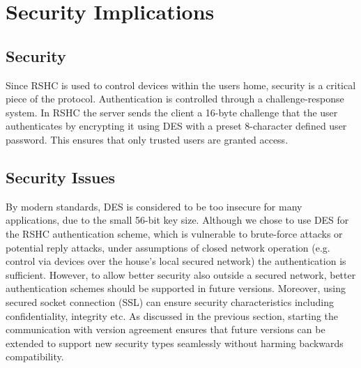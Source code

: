 \section{Security Implications}
\label{sec:security}

\subsection{Security}
\label{sec:security:sec}

Since RSHC is used to control devices within the users home, security is a critical piece of the protocol.  Authentication is controlled through a challenge-response system.  In RSHC the server sends the client a 16-byte challenge that the user authenticates by encrypting it using DES with a preset 8-character defined user password.  This ensures that only trusted users are granted access.

\subsection{Security Issues}
\label{sec:security:issues}

By modern standards, DES is considered to be too insecure for many applications, due to the small 56-bit key size. Although we chose to use DES for the RSHC authentication scheme, which is vulnerable to brute-force attacks or potential reply attacks, under assumptions of closed network operation (e.g. control via devices over the house's local secured network) the authentication is sufficient. However, to allow better security also outside a secured network, better authentication schemes should be supported in future versions. Moreover, using secured socket connection (SSL) can ensure security characteristics including confidentiality, integrity etc. As discussed in the previous section, starting the communication with version agreement ensures that future versions can be extended to support new security types seamlessly without harming backwards compatibility.
 